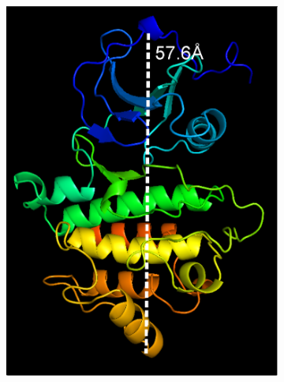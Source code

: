 \documentclass[../AdvancementSummary.tex]{subfiles}
\begin{document}
\begin{figure}
\begin{center}
\begin{subfigure}{0.4\linewidth}
\includegraphics[width=\linewidth]{LckPyMol/Diagonal.eps}
\caption{}
\end{subfigure}
\begin{subfigure}{0.4\linewidth}

\end{subfigure}
\end{center}
\end{figure}
\end{document}
